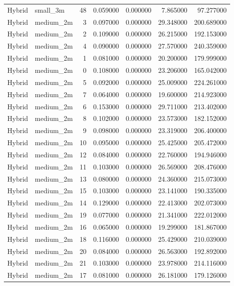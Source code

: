 \begin{tabular}{llrrrrr}
Hybrid & small_3m & 48 & 0.059000 & 0.000000 & 7.865000 & 97.277000 \\
Hybrid & medium_2m & 3 & 0.097000 & 0.000000 & 29.348000 & 200.689000 \\
Hybrid & medium_2m & 2 & 0.109000 & 0.000000 & 26.215000 & 192.153000 \\
Hybrid & medium_2m & 4 & 0.090000 & 0.000000 & 27.570000 & 240.359000 \\
Hybrid & medium_2m & 1 & 0.081000 & 0.000000 & 20.200000 & 179.999000 \\
Hybrid & medium_2m & 0 & 0.108000 & 0.000000 & 23.206000 & 165.042000 \\
Hybrid & medium_2m & 5 & 0.092000 & 0.000000 & 25.009000 & 224.261000 \\
Hybrid & medium_2m & 7 & 0.064000 & 0.000000 & 19.600000 & 214.923000 \\
Hybrid & medium_2m & 6 & 0.153000 & 0.000000 & 29.711000 & 213.402000 \\
Hybrid & medium_2m & 8 & 0.102000 & 0.000000 & 23.573000 & 182.152000 \\
Hybrid & medium_2m & 9 & 0.098000 & 0.000000 & 23.319000 & 206.400000 \\
Hybrid & medium_2m & 10 & 0.095000 & 0.000000 & 25.425000 & 205.472000 \\
Hybrid & medium_2m & 12 & 0.084000 & 0.000000 & 22.760000 & 194.946000 \\
Hybrid & medium_2m & 11 & 0.103000 & 0.000000 & 26.569000 & 208.476000 \\
Hybrid & medium_2m & 13 & 0.080000 & 0.000000 & 24.360000 & 215.073000 \\
Hybrid & medium_2m & 15 & 0.103000 & 0.000000 & 23.141000 & 190.335000 \\
Hybrid & medium_2m & 14 & 0.129000 & 0.000000 & 22.413000 & 202.073000 \\
Hybrid & medium_2m & 19 & 0.077000 & 0.000000 & 21.341000 & 222.012000 \\
Hybrid & medium_2m & 16 & 0.065000 & 0.000000 & 19.299000 & 181.867000 \\
Hybrid & medium_2m & 18 & 0.116000 & 0.000000 & 25.429000 & 210.039000 \\
Hybrid & medium_2m & 20 & 0.084000 & 0.000000 & 26.563000 & 192.892000 \\
Hybrid & medium_2m & 21 & 0.103000 & 0.000000 & 23.978000 & 214.116000 \\
Hybrid & medium_2m & 17 & 0.081000 & 0.000000 & 26.181000 & 179.126000 \\

\end{tabular}

